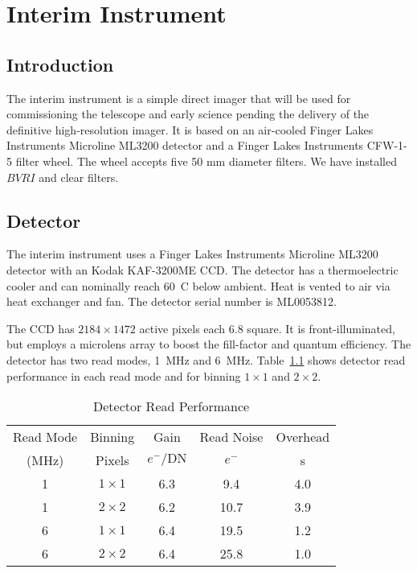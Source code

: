 \chapter{Interim Instrument}
\label{chapter:interim-instrument}

\section{Introduction}

The interim instrument is a simple direct imager that will be used for commissioning the telescope and early science pending the delivery of the definitive high-resolution imager. It is based on an air-cooled Finger Lakes Instruments Microline ML3200 detector and a Finger Lakes Instruments CFW-1-5 filter wheel. The wheel accepts five 50 mm diameter filters. We have installed $BVRI$ and clear filters.

\section{Detector}

The interim instrument uses a Finger Lakes Instruments Microline ML3200 detector with an Kodak KAF-3200ME CCD. The detector has a thermoelectric cooler and can nominally reach 60~C below ambient. Heat is vented to air via heat exchanger and fan. The detector serial number is ML0053812.

The CCD has $2184 \times 1472$ active pixels each 6.8 {\micron} square. It is front-illuminated, but employs a microlens array to boost the fill-factor and quantum efficiency. The detector has two read modes, 1~MHz and 6~MHz. Table~\ref{table:detector-read-performance} shows detector read performance in each read mode and for binning $1\times1$ and $2\times2$.

\begin{table}
\caption{Detector Read Performance}
\label{table:detector-read-performance}
\begin{center}
\begin{tabular}{ccccc}
\hline
\hline
Read Mode&Binning&Gain&Read Noise&Overhead\\
(MHz)&Pixels&$e^-/\mathrm{DN}$&$e^-$&s\\
\hline
1&$1 \times 1$&6.3&\phantom{0}9.4&4.0\\
1&$2 \times 2$&6.2&\phantom{}10.7&3.9\\
6&$1 \times 1$&6.4&\phantom{}19.5&1.2\\
6&$2 \times 2$&6.4&\phantom{}25.8&1.0\\
\hline
\end{tabular}
\end{center}
\end{table}

